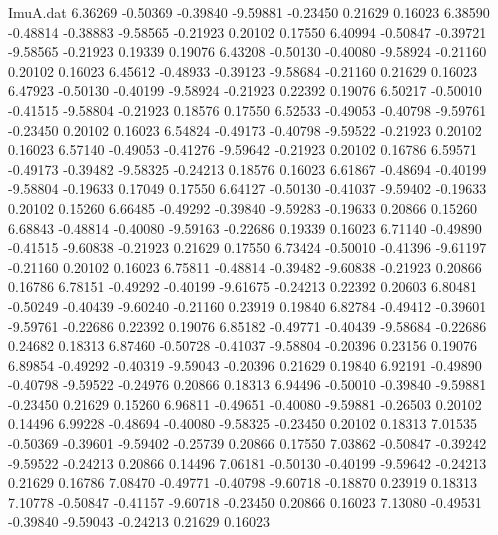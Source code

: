 \begin{filecontents}{ImuA.dat}
   6.36269   -0.50369   -0.39840   -9.59881   -0.23450    0.21629    0.16023
   6.38590   -0.48814   -0.38883   -9.58565   -0.21923    0.20102    0.17550
   6.40994   -0.50847   -0.39721   -9.58565   -0.21923    0.19339    0.19076
   6.43208   -0.50130   -0.40080   -9.58924   -0.21160    0.20102    0.16023
   6.45612   -0.48933   -0.39123   -9.58684   -0.21160    0.21629    0.16023
   6.47923   -0.50130   -0.40199   -9.58924   -0.21923    0.22392    0.19076
   6.50217   -0.50010   -0.41515   -9.58804   -0.21923    0.18576    0.17550
   6.52533   -0.49053   -0.40798   -9.59761   -0.23450    0.20102    0.16023
   6.54824   -0.49173   -0.40798   -9.59522   -0.21923    0.20102    0.16023
   6.57140   -0.49053   -0.41276   -9.59642   -0.21923    0.20102    0.16786
   6.59571   -0.49173   -0.39482   -9.58325   -0.24213    0.18576    0.16023
   6.61867   -0.48694   -0.40199   -9.58804   -0.19633    0.17049    0.17550
   6.64127   -0.50130   -0.41037   -9.59402   -0.19633    0.20102    0.15260
   6.66485   -0.49292   -0.39840   -9.59283   -0.19633    0.20866    0.15260
   6.68843   -0.48814   -0.40080   -9.59163   -0.22686    0.19339    0.16023
   6.71140   -0.49890   -0.41515   -9.60838   -0.21923    0.21629    0.17550
   6.73424   -0.50010   -0.41396   -9.61197   -0.21160    0.20102    0.16023
   6.75811   -0.48814   -0.39482   -9.60838   -0.21923    0.20866    0.16786
   6.78151   -0.49292   -0.40199   -9.61675   -0.24213    0.22392    0.20603
   6.80481   -0.50249   -0.40439   -9.60240   -0.21160    0.23919    0.19840
   6.82784   -0.49412   -0.39601   -9.59761   -0.22686    0.22392    0.19076
   6.85182   -0.49771   -0.40439   -9.58684   -0.22686    0.24682    0.18313
   6.87460   -0.50728   -0.41037   -9.58804   -0.20396    0.23156    0.19076
   6.89854   -0.49292   -0.40319   -9.59043   -0.20396    0.21629    0.19840
   6.92191   -0.49890   -0.40798   -9.59522   -0.24976    0.20866    0.18313
   6.94496   -0.50010   -0.39840   -9.59881   -0.23450    0.21629    0.15260
   6.96811   -0.49651   -0.40080   -9.59881   -0.26503    0.20102    0.14496
   6.99228   -0.48694   -0.40080   -9.58325   -0.23450    0.20102    0.18313
   7.01535   -0.50369   -0.39601   -9.59402   -0.25739    0.20866    0.17550
   7.03862   -0.50847   -0.39242   -9.59522   -0.24213    0.20866    0.14496
   7.06181   -0.50130   -0.40199   -9.59642   -0.24213    0.21629    0.16786
   7.08470   -0.49771   -0.40798   -9.60718   -0.18870    0.23919    0.18313
   7.10778   -0.50847   -0.41157   -9.60718   -0.23450    0.20866    0.16023
   7.13080   -0.49531   -0.39840   -9.59043   -0.24213    0.21629    0.16023

\end{filecontents}
